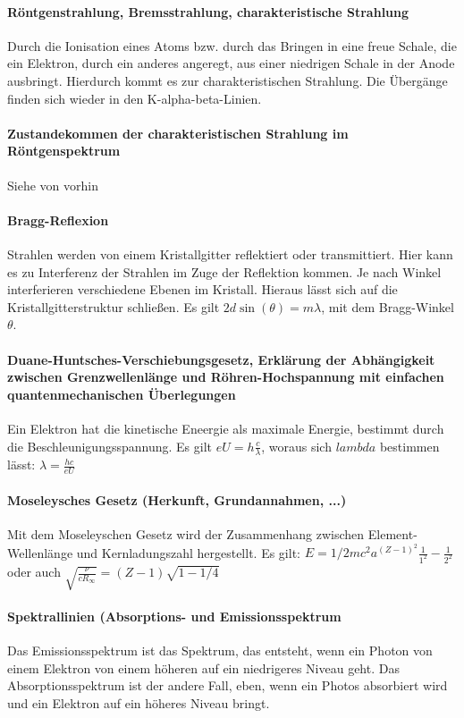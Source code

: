 \documentclass[12pt,oneside,oldfontcommands]{memoir}
\begin{document}
\paragraph{Röntgenstrahlung, Bremsstrahlung, charakteristische Strahlung}
Durch die Ionisation eines Atoms bzw. durch das Bringen in eine freue Schale, die ein Elektron, durch ein anderes angeregt, aus einer niedrigen Schale in der Anode ausbringt. Hierdurch kommt es zur charakteristischen Strahlung. Die Übergänge finden sich wieder in den K-alpha-beta-Linien.

\paragraph{Zustandekommen der charakteristischen Strahlung im Röntgenspektrum}
Siehe von vorhin

\paragraph{Bragg-Reflexion}
Strahlen werden von einem Kristallgitter reflektiert oder transmittiert. Hier kann es zu Interferenz der Strahlen im Zuge der Reflektion kommen. Je nach Winkel interferieren verschiedene Ebenen im Kristall. Hieraus lässt sich auf die Kristallgitterstruktur schließen. Es gilt $2d \sin (\theta) = m \lambda$, mit dem Bragg-Winkel $\theta$.

\paragraph{Duane-Huntsches-Verschiebungsgesetz, Erklärung der Abhängigkeit zwischen Grenzwellenlänge und Röhren-Hochspannung mit einfachen quantenmechanischen Überlegungen}
Ein Elektron hat die kinetische Eneergie als maximale Energie, bestimmt durch die Beschleunigungsspannung. Es gilt $eU = h \frac{c}{\lambda}$, woraus sich $lambda$ bestimmen lässt: $\lambda = \frac{hc}{eU}$

\paragraph{Moseleysches Gesetz (Herkunft, Grundannahmen, ...)}
Mit dem Moseleyschen Gesetz wird der Zusammenhang zwischen Element-Wellenlänge und Kernladungszahl hergestellt. Es gilt: $E = 1/2 m c^2 a^(Z-1)^2 \frac{1}{1^2}- \frac{1}{2^2}$ oder auch $\sqrt{\frac{\nu}{cR_{\infty}}} = (Z-1)\sqrt{1-1/4}$
 
\paragraph{Spektrallinien (Absorptions- und Emissionsspektrum}
Das Emissionsspektrum ist das Spektrum, das entsteht, wenn ein Photon von einem Elektron von einem höheren auf ein niedrigeres Niveau geht. Das Absorptionsspektrum ist der andere Fall, eben, wenn ein Photos absorbiert wird und ein Elektron auf ein höheres Niveau bringt.
\end{document}
